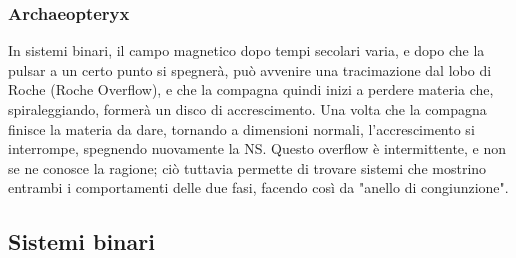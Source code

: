 \subsubsection{Archaeopteryx}
In sistemi binari, il campo magnetico dopo tempi secolari varia, e dopo che la pulsar a un certo punto si spegnerà, può avvenire una tracimazione dal lobo di Roche (Roche Overflow), e che la compagna quindi inizi a perdere materia che, spiraleggiando, formerà un disco di accrescimento.
Una volta che la compagna finisce la materia da dare, tornando a dimensioni normali, l'accrescimento si interrompe, spegnendo nuovamente la NS.
Questo overflow è intermittente, e non se ne conosce la ragione; ciò tuttavia permette di trovare sistemi che mostrino entrambi i comportamenti delle due fasi, facendo così da "anello di congiunzione".

\subsection{Sistemi binari}

